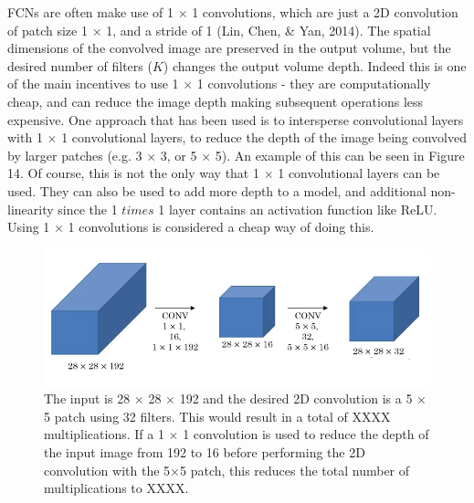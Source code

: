 \documentclass[a4paper]{article}
\begin{document}
FCNs are often make use of 1 $\times$ 1 convolutions, which are just a 2D convolution of patch size 1 $\times$ 1, and a stride of 1 (Lin, Chen, \& Yan, 2014). The spatial dimensions of the convolved image are preserved in the output volume, but the desired number of filters ($K$) changes the output volume depth. Indeed this is one of the main incentives to use 1 $\times$ 1 convolutions - they are computationally cheap, and can reduce the image depth making subsequent operations less expensive. One approach that has been used is to intersperse convolutional layers with 1 $\times$ 1 convolutional layers, to reduce the depth of the image being convolved by larger patches (e.g. 3 $\times$ 3, or 5 $\times$ 5). An example of this can be seen in Figure 14. Of course, this is not the only way that 1 $\times$ 1 convolutional layers can be used. They can also be used to add more depth to a model, and additional non-linearity since the 1 $times$ 1 layer contains an activation function like ReLU. Using 1 $\times$ 1 convolutions is considered a cheap way of doing this.  
\begin{figure}[h]
\centering
\includegraphics[scale=0.4]{1by1}
\caption{The input is 28 $\times$ 28 $\times$ 192 and the desired 2D convolution is a 5 $\times$ 5 patch using 32 filters. This would result in a total of XXXX multiplications. If a 1 $\times$ 1 convolution is used to reduce the depth of the input image from 192 to 16 before performing the 2D convolution with the 5$\times$5 patch, this reduces the total number of multiplications to XXXX.}
\end{figure}
\end{document}
